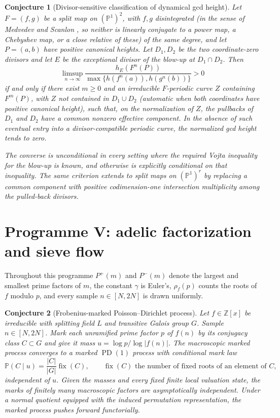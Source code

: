 \documentclass[11pt]{article}
\newtheorem{conjecture}{Conjecture}
\theoremstyle{definition}
\newcommand{\PD}{\operatorname{PD}}
\newcommand{\Pp}{\mathbb P}
\newcommand{\Z}{\mathbb Z}
\providecommand{\Z}{\mathbb Z}
\providecommand{\Pp}{\mathbb P}
\begin{document}
\begin{conjecture}[Divisor-sensitive classification of dynamical gcd height]\label{s20}
Let $F=(f,g)$ be a split map on $(\mathbb P^1)^2$, with $f,g$ disintegrated (in the sense of Medvedev and Scanlon
\cite{MedvedevScanlon}, so neither is
linearly conjugate to a power map, a Chebyshev map, or a close relative of these) of
the same degree, and let $P=(a,b)$ have positive canonical heights.  Let $D_1,D_2$ be the two
coordinate-zero divisors and let $E$ be the exceptional divisor of the blow-up at
$D_1\cap D_2$.  Then
\[
 \limsup_{n\to\infty}
 \frac{h_E(F^n(P))}{\max\{h(f^n(a)),h(g^n(b))\}}>0
\]
if and only if there exist $m\ge0$ and an irreducible $F$-periodic curve $Z$ containing $F^m(P)$, with $Z$ not contained in $D_1\cup D_2$ (automatic when both coordinates have positive canonical height), such that, on the normalization of $Z$, the pullbacks of $D_1$ and $D_2$ have a
common nonzero effective component.  In the absence of such eventual entry into a
divisor-compatible periodic curve, the normalized gcd height tends to zero.

The converse is unconditional in every setting where the required Vojta inequality for
the blow-up is known, and otherwise is explicitly conditional on that inequality.  The
same criterion extends to split maps on $(\mathbb P^1)^r$ by replacing a common component
with positive codimension-one intersection multiplicity among the pulled-back divisors.
\end{conjecture}

\section{Programme V: adelic factorization and sieve flow}

Throughout this programme $P^+(m)$ and $P^-(m)$ denote the largest and smallest prime
factors of $m$, the constant $\gamma$ is Euler's, $\rho_f(p)$ counts the roots
of $f$ modulo $p$, and every sample $n\in[N,2N]$ is drawn uniformly.

\begin{conjecture}[Frobenius-marked Poisson--Dirichlet process]\label{s21}
Let $f\in\Z[x]$ be irreducible with splitting field $L$ and transitive Galois group
$G$.  Sample $n\in[N,2N]$.  Mark each unramified prime factor $p$ of $f(n)$ by its
conjugacy class $C\subset G$ and give it mass $u=\log p/\log|f(n)|$.  The macroscopic
marked process converges to a marked $\PD(1)$ process with conditional mark law
\[
 \Pp(C\mid u)=\frac{|C|}{|G|}\operatorname{fix}(C),\qquad\text{$\operatorname{fix}(C)$ the number of fixed roots of an element of $C$,}
\]
independent of $u$.  Given the masses and every fixed finite local valuation state, the
marks of finitely many macroscopic factors are asymptotically independent.  Under a
normal quotient equipped with the induced permutation representation, the marked
process pushes forward functorially.
\end{conjecture}
\end{document}
